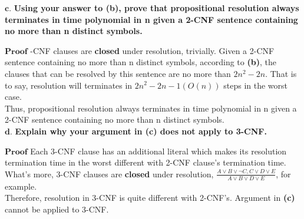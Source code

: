 \documentclass{article}
\begin{document}
\begin{CJK*}{GBK}{song}
    $\mathbf{c.}$ \textbf{Using your answer to (b), prove that propositional resolution always terminates in time polynomial in n given a 2-CNF sentence containing no more than n distinct symbols.}

    $\textbf{Proof}$ -CNF clauses are \textbf{closed} under resolution, trivially. Given a 2-CNF sentence containing no more than n distinct symbols, according to \textbf{(b)}, the clauses that can be resolved by this sentence are no more than $2n^2-2n$. That is to say, resolution will terminates in $2n^2-2n-1(O(n))$ steps in the worst case. \\\indent Thus, propositional resolution always terminates in time polynomial in n given a 2-CNF sentence containing no more than n distinct symbols.\\

    $\mathbf{d.}$ \textbf{Explain why your argument in (c) does not apply to 3-CNF.}

    $\textbf{Proof}$ \quad Each 3-CNF clause has an additional literal which makes its resolution termination time in the worst different with 2-CNF clause's termination time. What's more, 3-CNF clauses are \textbf{closed} under resolution, $\frac{A\lor B \lor \lnot C, C\lor D \lor E}{A\lor B \lor D \lor E}$, for example. \\\indent Therefore, resolution in 3-CNF is quite different with 2-CNF's. Argument in \textbf{(c)} cannot be applied to 3-CNF.
    
\end{CJK*}
\end{document}
